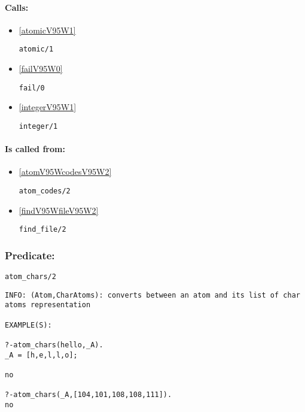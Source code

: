 \paragraph{Calls:} 
\begin{itemize}
\item \ref{atomicV95W1} 
\begin{verbatim}
atomic/1
\end{verbatim}

\item \ref{failV95W0} 
\begin{verbatim}
fail/0
\end{verbatim}

\item \ref{integerV95W1} 
\begin{verbatim}
integer/1
\end{verbatim}

\end{itemize}
\paragraph{Is called from:} 
\begin{itemize}
\item \ref{atomV95WcodesV95W2} 
\begin{verbatim}
atom_codes/2
\end{verbatim}

\item \ref{findV95WfileV95W2} 
\begin{verbatim}
find_file/2
\end{verbatim}

\end{itemize}

\subsubsection{Predicate:} \label{atomV95WcharsV95W2}

\begin{verbatim}
atom_chars/2
\end{verbatim}

{\small \begin{verbatim}
INFO: (Atom,CharAtoms): converts between an atom and its list of char atoms representation

EXAMPLE(S):

?-atom_chars(hello,_A).
_A = [h,e,l,l,o];

no

?-atom_chars(_A,[104,101,108,108,111]).
no

\end{verbatim}}
